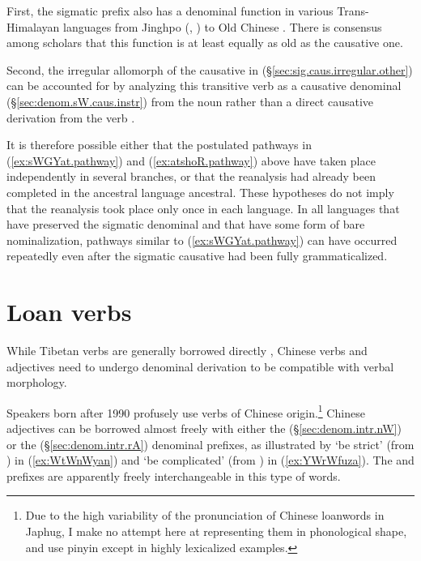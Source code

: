 First, the sigmatic prefix also has a denominal function in various Trans-Hi\-mal\-ayan languages from Jinghpo (\citealt[72]{dai92yufa}, \citealt[88]{kurabe16jinghpo}) to Old Chinese \citep{conrady1896}. There is consensus among scholars that this function is at least equally as old as the causative one.

Second, the irregular  allomorph of the causative in  (§\ref{sec:sig.caus.irregular.other}) can be accounted for by analyzing this transitive verb as a causative denominal (§\ref{sec:denom.sW.caus.instr}) from the noun   rather than a direct causative derivation from the verb .  
 
It is therefore possible either that the postulated pathways in (\ref{ex:sWGYat.pathway}) and (\ref{ex:atshoR.pathway}) above have taken place independently in several branches, or that the reanalysis had already been completed in the ancestral language ancestral. These hypotheses do not imply that the reanalysis took place only once in each language. In all languages that have preserved the sigmatic denominal and that have some form of bare nominalization, pathways similar to (\ref{ex:sWGYat.pathway}) can have occurred repeatedly even after the sigmatic causative had been fully grammaticalized.

\section{Loan verbs} \label{sec:zh.loanverbs}
While Tibetan verbs are generally borrowed directly \citep{jacques19contact}, Chinese verbs and adjectives need to undergo denominal derivation to be compatible with verbal morphology.

Speakers born after 1990 profusely use verbs of Chinese origin.\footnote{Due to the high variability of the pronunciation of Chinese loanwords in Japhug, I make no attempt here at representing them in phonological shape, and use pinyin except in highly lexicalized examples. } Chinese adjectives can be borrowed almost freely with either the  (§\ref{sec:denom.intr.nW}) or the  (§\ref{sec:denom.intr.rA}) denominal prefixes, as illustrated by  `be strict' (from ) in (\ref{ex:WtWnWyan}) and  `be complicated' (from ) in (\ref{ex:YWrWfuza}). The  and  prefixes are apparently freely interchangeable in this type of words.

